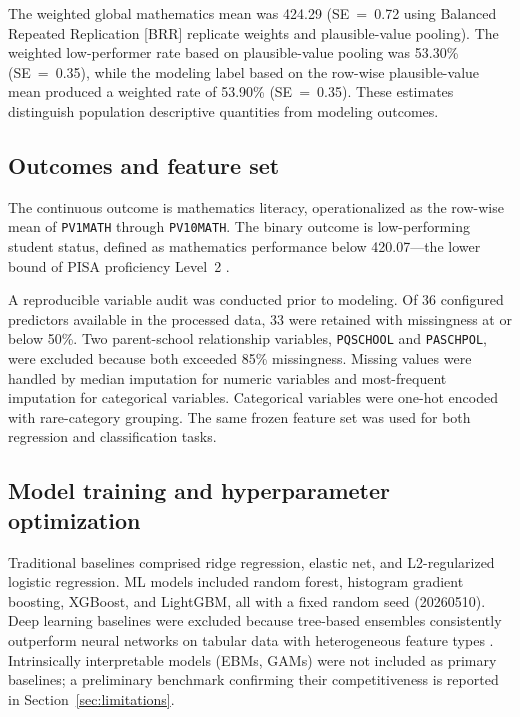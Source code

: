 \documentclass[review,12pt]{elsarticle}
\begin{document}
The weighted global mathematics mean was 424.29 (SE~=~0.72 using Balanced Repeated Replication [BRR] replicate weights and plausible-value pooling). The weighted low-performer rate based on plausible-value pooling was 53.30\% (SE~=~0.35), while the modeling label based on the row-wise plausible-value mean produced a weighted rate of 53.90\% (SE~=~0.35). These estimates distinguish population descriptive quantities from modeling outcomes.

\subsection{Outcomes and feature set}

The continuous outcome is mathematics literacy, operationalized as the row-wise mean of \texttt{PV1MATH} through \texttt{PV10MATH}. The binary outcome is low-performing student status, defined as mathematics performance below 420.07---the lower bound of PISA proficiency Level~2 \citep{NCES_2022_cut_scores}.

A reproducible variable audit was conducted prior to modeling. Of 36 configured predictors available in the processed data, 33 were retained with missingness at or below 50\%. Two parent-school relationship variables, \texttt{PQSCHOOL} and \texttt{PASCHPOL}, were excluded because both exceeded 85\% missingness. Missing values were handled by median imputation for numeric variables and most-frequent imputation for categorical variables. Categorical variables were one-hot encoded with rare-category grouping. The same frozen feature set was used for both regression and classification tasks.

\subsection{Model training and hyperparameter optimization}

Traditional baselines comprised ridge regression, elastic net, and L2-regularized logistic regression. ML models included random forest, histogram gradient boosting, XGBoost, and LightGBM, all with a fixed random seed (20260510). Deep learning baselines were excluded because tree-based ensembles consistently outperform neural networks on tabular data with heterogeneous feature types \citep{Grinsztajn_2022_tree_vs_dl,Ersozlu_2024}. Intrinsically interpretable models (EBMs, GAMs) were not included as primary baselines; a preliminary benchmark confirming their competitiveness is reported in Section~\ref{sec:limitations}.
\end{document}
